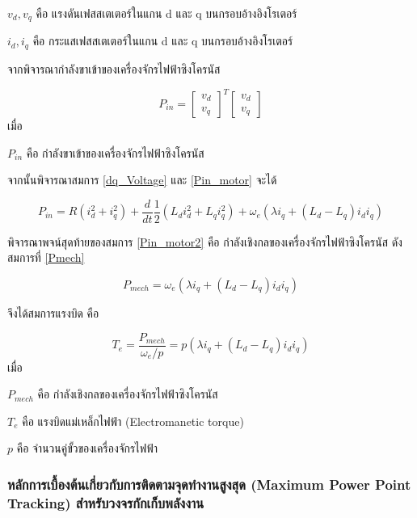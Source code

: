 \documentclass[11pt,a4paper]{article}
\begin{document}
$v_{d},v_{q}$ คือ แรงดันเฟสสเตเตอร์ในแกน d และ q บนกรอบอ้างอิงโรเตอร์

$i_{d},i_{q}$ คือ กระแสเฟสสเตเตอร์ในแกน d และ q บนกรอบอ้างอิงโรเตอร์

จากพิจารณากำลังขาเข้าของเครื่องจักรไฟฟ้าซิงโครนัส

\begin{equation}\label{Pin_motor}
    P_{in} =
    \begin{bmatrix}
        v_{d} \\v_{q}
    \end{bmatrix}^T
    \begin{bmatrix}
        v_{d} \\v_{q}
    \end{bmatrix}
\end{equation}
เมื่อ

$P_{in}$ คือ กำลังขาเข้าของเครื่องจักรไฟฟ้าซิงโครนัส

จากนั้นพิจารณาสมการ \ref{dq_Voltage} และ \ref{Pin_motor} จะได้

\begin{equation}\label{Pin_motor2}
    P_{in} = R(i_{d}^2 +i_{q}^2) + \frac{d}{dt} \frac{1}{2} (L_{d}i_{d}^2 + L_{q}i_{q}^2) + \omega_{e}(\lambda i_{q} + (L_{d} - L_{q})i_{d}i_{q} )
\end{equation}

พิจารณาพจน์สุดท้ายของสมการ \ref{Pin_motor2} คือ กำลังเชิงกลของเครื่องจักรไฟฟ้าซิงโครนัส ดังสมการที่ \ref{Pmech}

\begin{equation}\label{Pmech}
    P_{mech} =  \omega_{e}(\lambda i_{q} + (L_{d} - L_{q})i_{d}i_{q} )
\end{equation}

จึงได้สมการแรงบิด คือ

\begin{equation}\label{Pmech}
    T_{e} = \frac{P_{mech}}{ \omega_{e}/p } =  p(\lambda i_{q} + (L_{d} - L_{q})i_{d}i_{q} )
\end{equation}
เมื่อ

$P_{mech}$ คือ กำลังเชิงกลของเครื่องจักรไฟฟ้าซิงโครนัส

$T_{e}$ คือ แรงบิดแม่เหล็กไฟฟ้า (Electromanetic torque)

$p$ คือ จำนวนคู่ขั้วของเครื่องจักรไฟฟ้า

\subsubsection{หลักการเบื้องต้นเกี่ยวกับการติดตามจุดทำงานสูงสุด (Maximum Power Point Tracking) สำหรับวงจรกักเก็บพลังงาน}
\end{document}
